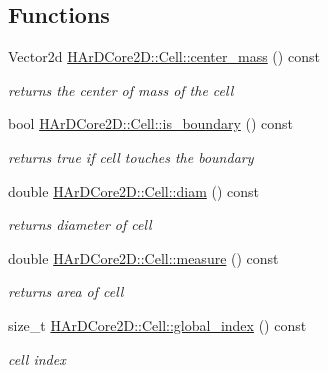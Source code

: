 \subsection*{Functions}
\begin{DoxyCompactItemize}
\item 
\mbox{\label{group__Mesh_ga66b278b12266d5c5bfee8699886cc89b}} 
Vector2d \hyperlink{group__Mesh_ga66b278b12266d5c5bfee8699886cc89b}{H\+Ar\+D\+Core2\+D\+::\+Cell\+::center\+\_\+mass} () const
\begin{DoxyCompactList}\small\item\em returns the center of mass of the cell \end{DoxyCompactList}\item 
\mbox{\label{group__Mesh_ga710ded03b7741c8377e0b2dda2395b46}} 
bool \hyperlink{group__Mesh_ga710ded03b7741c8377e0b2dda2395b46}{H\+Ar\+D\+Core2\+D\+::\+Cell\+::is\+\_\+boundary} () const
\begin{DoxyCompactList}\small\item\em returns true if cell touches the boundary \end{DoxyCompactList}\item 
\mbox{\label{group__Mesh_ga84c743487088ebb64ca0c860329c7162}} 
double \hyperlink{group__Mesh_ga84c743487088ebb64ca0c860329c7162}{H\+Ar\+D\+Core2\+D\+::\+Cell\+::diam} () const
\begin{DoxyCompactList}\small\item\em returns diameter of cell \end{DoxyCompactList}\item 
\mbox{\label{group__Mesh_gac19ec98507a18d255bd54b1e55b16653}} 
double \hyperlink{group__Mesh_gac19ec98507a18d255bd54b1e55b16653}{H\+Ar\+D\+Core2\+D\+::\+Cell\+::measure} () const
\begin{DoxyCompactList}\small\item\em returns area of cell \end{DoxyCompactList}\item 
\mbox{\label{group__Mesh_ga36d093e9886bcd4befae4ddf5f75f2ee}} 
size\+\_\+t \hyperlink{group__Mesh_ga36d093e9886bcd4befae4ddf5f75f2ee}{H\+Ar\+D\+Core2\+D\+::\+Cell\+::global\+\_\+index} () const
\begin{DoxyCompactList}\small\item\em cell index \end{DoxyCompactList}\item 

\end{DoxyCompactItemize}
